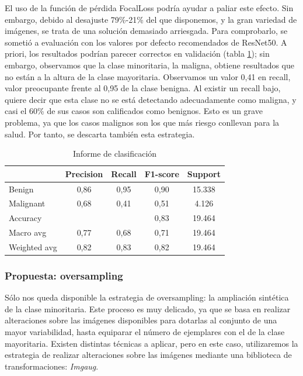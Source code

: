 El uso de la función de pérdida FocalLoss podría ayudar a paliar este efecto. Sin embargo, debido al desajuste 79\%-21\% del que disponemos, y la gran variedad de imágenes, se trata de una solución demasiado arriesgada. Para comprobarlo, se sometió a evaluación con los valores por defecto recomendados de ResNet50. A priori, los resultados podrían parecer correctos en validación (tabla \ref{tab:resultsfl}); sin embargo, observamos que la clase minoritaria, la maligna, obtiene resultados que no están a la altura de la clase mayoritaria. Observamos un valor 0,41 en recall, valor preocupante frente al 0,95 de la clase benigna. Al existir un recall bajo, quiere decir que esta clase no se está detectando adecuadamente como maligna, y casi el 60\% de sus casos son calificados como benignos. Esto es un grave problema, ya que los casos malignos son los que más riesgo conllevan para la salud. Por tanto, se descarta también esta estrategia.


\begin{table}[!ht]
	\centering
	\begin{tabular}{|l|c|c|c|c|}
		\hline
		& Precision & Recall & F1-score & Support \\
		\hline
		Benign & 0,86 & 0,95 & 0,90 & 15.338 \\
		Malignant & 0,68 & 0,41 & 0,51 & 4.126 \\
		\hline
		Accuracy &  &  & 0,83 & 19.464 \\ \hline
		Macro avg & 0,77& 0,68& 0,71&19.464\\
		Weighted avg&0,82&0,83&0,82&19.464\\
		\hline
	\end{tabular}
	\caption{Informe de clasificación}
	\label{tab:resultsfl}
\end{table}

\subsubsection{Propuesta: oversampling}

Sólo nos queda disponible la estrategia de oversampling: la ampliación sintética de la clase minoritaria. Este proceso es muy delicado, ya que se basa en realizar alteraciones sobre las imágenes disponibles para dotarlas al conjunto de una mayor variabilidad, hasta equiparar el número de ejemplares con el de la clase mayoritaria. Existen distintas técnicas a aplicar, pero en este caso, utilizaremos la estrategia de realizar alteraciones sobre las imágenes mediante una biblioteca de transformaciones: \textit{Imgaug}.

